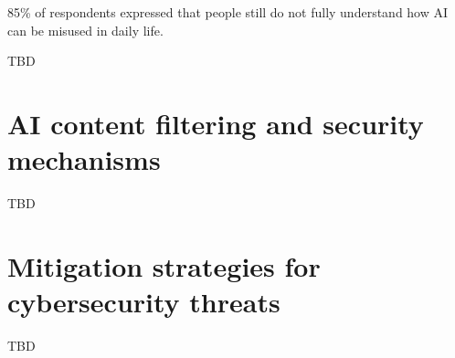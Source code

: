 85\% of respondents expressed that people still do not fully understand how AI can be misused in daily life.

TBD

\section{AI content filtering and security mechanisms}

TBD


\section{Mitigation strategies for cybersecurity threats}
TBD

